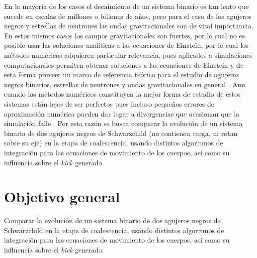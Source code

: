 	En la mayoría de los casos el decaimíento de un sistema binario es tan lento que sucede en escalas de millones o billones de años, pero para el caso de los agujeros negros y estrellas de neutrones las ondas gravitacionales son de vital importancia. En estos mismos casos los campos gravitacionales son fuertes, por lo cual no es posible usar las soluciones analíticas a las ecuaciones de Einstein, por lo cual los métodos numéricos adquieren particular relevancia, pues aplicados a simulaciones computacionales permiten obtener soluciones a las ecuaciones de Einstein y de esta forma proveer un marco de referencia teórico para el estudio de agujeros negros binarios, estrellas de neutrones y ondas gravitacionales en general \cite{brugmann2018fundamentals}. Aun cuando los m\'etodos num\'ericos constituyen la mejor forma de estudio de estos sistemas est\'an lejos de ser perfectos pues incluso peque\~nos errores de aproximaci\'on num\'erica pueden dar lugar a divergencias que ocasionan que la simulaci\'on falle \cite{brugmann2018fundamentals}. Por esta raz\'on se busca comparar la evoluci\'on de un sistema binario de dos agujeros negros de Schwarzchild (no contienen carga, ni rotan sobre su eje) en la etapa de coalescencia, usando distintos algoritmos de integraci\'on para las ecuaciones de movimiento de los cuerpos, as\'i como su influencia sobre el \textit{kick} generado.
%	
	
\section{Objetivo general}
	Comparar la evoluci\'on de un sistema binario de dos agujeros negros de Schwarzchild en la etapa de coalescencia, usando distintos algoritmos de integraci\'on para las ecuaciones de movimiento de los cuerpos, as\'i como su influencia sobre el \textit{kick} generado.
		
